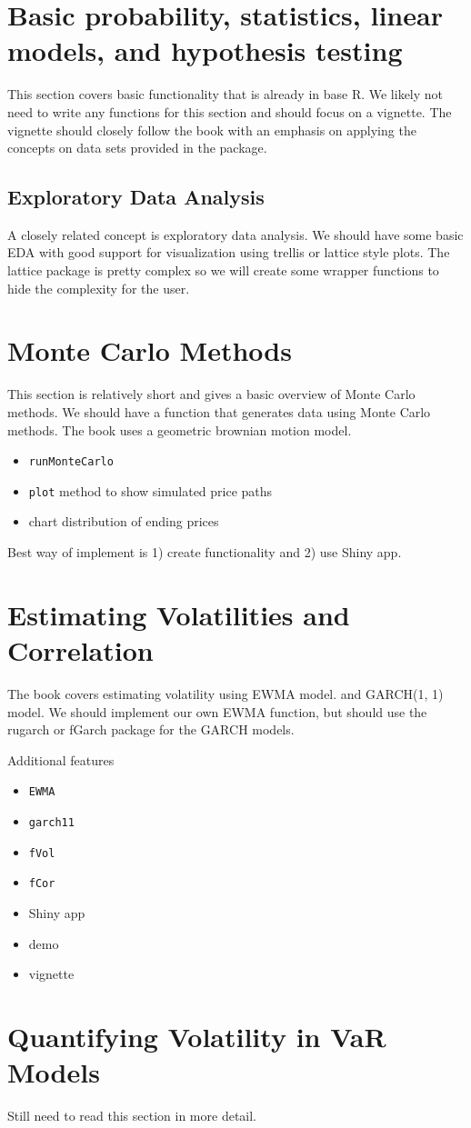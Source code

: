 \documentclass[12pt]{amsart}
\begin{document}
\section{Basic probability, statistics, linear models, and hypothesis testing}
This section covers basic functionality that is already in base R. We likely not need to write any functions for this section and should focus on a vignette. The vignette should closely follow the book with an emphasis on applying the concepts on data sets provided in the package.

\subsection{Exploratory Data Analysis}
A closely related concept is exploratory data analysis. We should have some basic EDA with good support for visualization using trellis or lattice style plots. The lattice package is pretty complex so we will create some wrapper functions to hide the complexity for the user.

\section{Monte Carlo Methods}
This section is relatively short and gives a basic overview of Monte Carlo methods. We should have a function that generates data using Monte Carlo methods. The book uses a geometric brownian motion model.

\begin{itemize}
\item \verb"runMonteCarlo"
\item \verb"plot" method to show simulated price paths
\item chart distribution of ending prices
\end{itemize}
Best way of implement is 1) create functionality and 2) use Shiny app.


\section{Estimating Volatilities and Correlation}
The book covers estimating volatility using EWMA model. and GARCH(1, 1) model. We should implement our own EWMA function, but should use the rugarch or fGarch package for the GARCH models.

Additional features
\begin{itemize}
\item \verb"EWMA"
\item \verb"garch11"
\item \verb"fVol"
\item \verb"fCor"
\item Shiny app
\item demo
\item vignette
\end{itemize}

\section{Quantifying Volatility in VaR Models}
Still need to read this section in more detail.
\end{document}

